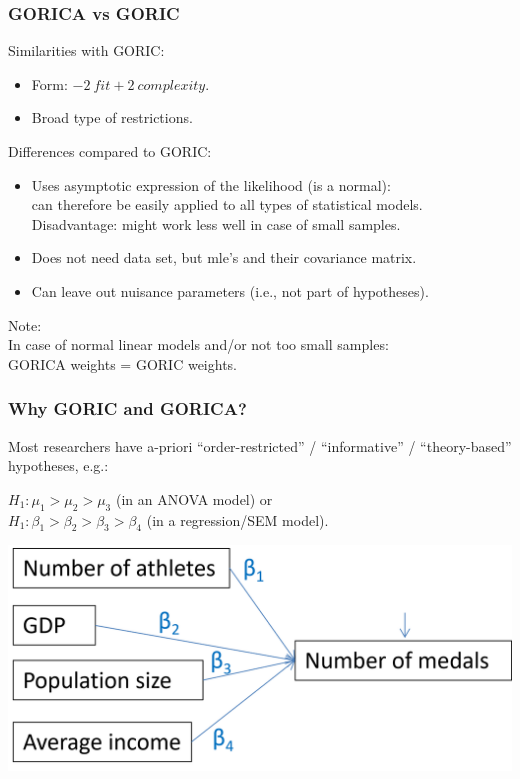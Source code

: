 \documentclass[10pt]{beamer}\usepackage[]{graphicx}\usepackage[]{xcolor}
\begin{document}
\begin{frame}
	\frametitle{GORICA vs GORIC}
	
	Similarities with GORIC:
		\begin{itemize}
			\item Form: $-2 \ fit + 2 \ complexity$.
			\item Broad type of restrictions.
		\end{itemize}
		
		\vspace{.5 cm}
	
	Differences compared to GORIC:
		\begin{itemize}
			\item Uses asymptotic expression of the likelihood (is a normal): \\
			can therefore be easily applied to all types of statistical models. \\
			Disadvantage: might work less well in case of small samples.
			\item Does not need data set, but
			mle's and their covariance matrix.
			\item Can leave out nuisance parameters (i.e., not part of hypotheses).
		\end{itemize}
	
	\vspace{.5 cm}
	
	Note:\\
		In case of normal linear models and/or not too small samples: \\
		GORICA weights = GORIC weights.
\end{frame}
%
\begin{frame}
	\frametitle{Why GORIC and GORICA?}

Most researchers have a-priori ``order-restricted'' / ``informative'' / ``theory-based'' hypotheses, e.g.:

\vspace{.5 cm}

$H_{1}:  \mu_1 > \mu_2 > \mu_3$ (in an ANOVA model) or \\
$H_{1}:  \beta_1 > \beta_2 > \beta_3 > \beta_4$ (in a regression/SEM model). 

\vspace{2\baselineskip}
\includegraphics[width = 0.6\linewidth]{Model-Unc.png}

\end{frame}
\end{document}
